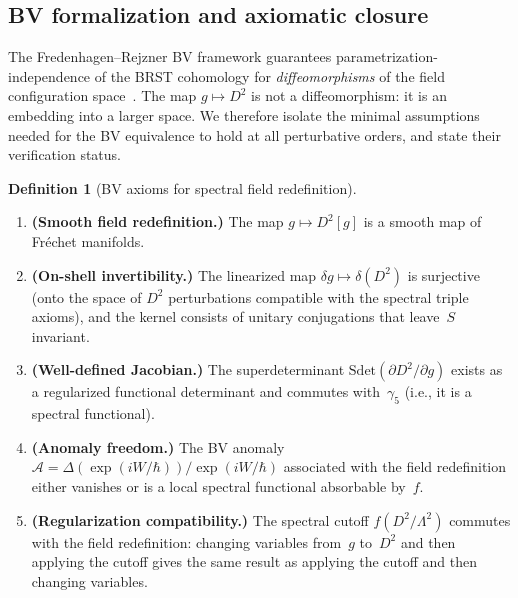 \documentclass[12pt,a4paper]{article}
\theoremstyle{definition}
\newtheorem{definition}[theorem]{Definition}
\theoremstyle{remark}
\newcommand{\Lam}{\Lambda}
\begin{document}
\subsection{BV formalization and axiomatic closure}
\label{sec:bv_axiomatic}

The Fredenhagen--Rejzner BV framework guarantees
parametrization-independence of the BRST cohomology for \emph{diffeomorphisms}
of the field configuration
space~\cite{Fredenhagen:2011bv, Fredenhagen:2012classical, Rejzner:2016book}.
The map $g \mapsto D^2$ is not a diffeomorphism: it is an embedding into a
larger space.  We therefore isolate the minimal assumptions needed for the
BV equivalence to hold at all perturbative orders, and state their
verification status.

\begin{definition}[BV axioms for spectral field redefinition]
\label{def:bv_axioms}
\mbox{}
\begin{enumerate}[\bfseries BV-1:]
  \item \textbf{(Smooth field redefinition.)}
    The map $g \mapsto D^2[g]$ is a smooth map of Fr{\'e}chet manifolds.
  \item \textbf{(On-shell invertibility.)}
    The linearized map $\delta g \mapsto \delta(D^2)$ is surjective
    (onto the space of $D^2$ perturbations compatible with the spectral
    triple axioms), and the kernel consists of unitary conjugations
    that leave~$S$ invariant.
  \item \textbf{(Well-defined Jacobian.)}
    The superdeterminant $\mathrm{Sdet}(\partial D^2 / \partial g)$
    exists as a regularized functional determinant and commutes
    with~$\gamma_5$ (i.e., it is a spectral functional).
  \item \textbf{(Anomaly freedom.)}
    The BV anomaly $\mathcal{A} = \Delta(\exp(iW/\hbar))/\exp(iW/\hbar)$
    associated with the field redefinition either vanishes or is a local
    spectral functional absorbable by~$f$.
  \item \textbf{(Regularization compatibility.)}
    The spectral cutoff $f(D^2/\Lam^2)$ commutes with the field
    redefinition: changing variables from~$g$ to~$D^2$ and then applying
    the cutoff gives the same result as applying the cutoff and then
    changing variables.
\end{enumerate}
\end{definition}
\end{document}
